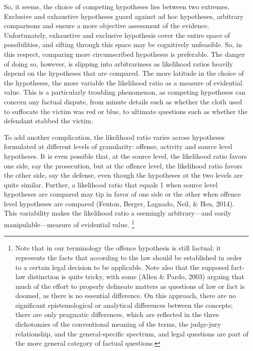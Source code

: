 \documentclass[
  10pt,
  dvipsnames,enabledeprecatedfontcommands]{scrartcl}
\newcommand{\mar}[1]{\todo[color=blue!40]{#1}}
\begin{document}
So, it seems, the choice of competing hypotheses lies between two
extremes. Exclusive and exhaustive hypotheses guard against ad hoc
hypotheses, arbitrary comparisons and ensure a more objective assessment
of the evidence. Unfortunately, exhaustive and exclusive hypothesis
cover the entire space of possibilities, and sifting through this space
may be cognitively unfeasible. So, in this respect, comparing more
circumscribed hypotheses is preferable. The danger of doing so, however,
is slipping into arbitrariness as likelihood ratios heavily depend on
the hypotheses that are compared. The more latitude in the choice of the
hypotheses, the more variable the likelihood ratio as a measure of
evidential value. This is a particularly troubling phenomenon, as
competing hypotheses can concern any factual dispute, from minute
details such as whether the cloth used to suffocate the victim was red
or blue, to ultimate questions such as whether the defendant stabbed the
victim.

To add another complication, the likelihood ratio varies across
hypotheses formulated at different levels of granularity: offense,
activity and source level hypotheses. It is even possible that, at the
source level, the likelihood ratio favors one side, say the prosecution,
but at the offence level, the likelihood ratio favors the other side,
say the defense, even though the hypotheses at the two levels are quite
similar. Further, a likelihood ratio that equals 1 when source level
hypotheses are compared may tip in favor of one side or the other when
offence level hypotheses are compared (Fenton, Berger, Lagnado, Neil, \&
Hsu, 2014). This variability makes the likelihood ratio a seemingly
arbitrary---and easily manipulable---measure of evidential value.
\mar{R added footnote here, check.}\footnote{Note that in our
  terminology the offence hypothesis is still factual: it represents the
  facts that according to the law should be established in order to a
  certain legal decision to be applicable. Note also that the supposed
  fact-law distinction is quite tricky, with some (Allen \& Pardo, 2003)
  arguing that much of the effort to properly delineate matters as
  questions of law or fact is doomed, as there is no essential
  difference. On this approach, there are no significant epistemological
  or analytical differences between the concepts; there are only
  pragmatic differences, which are reflected in the three dichotomies of
  the conventional meaning of the terms, the judge-jury relationship,
  and the general-specific spectrum, and legal questions are part of the
  more general category of factual questions.}
\end{document}
